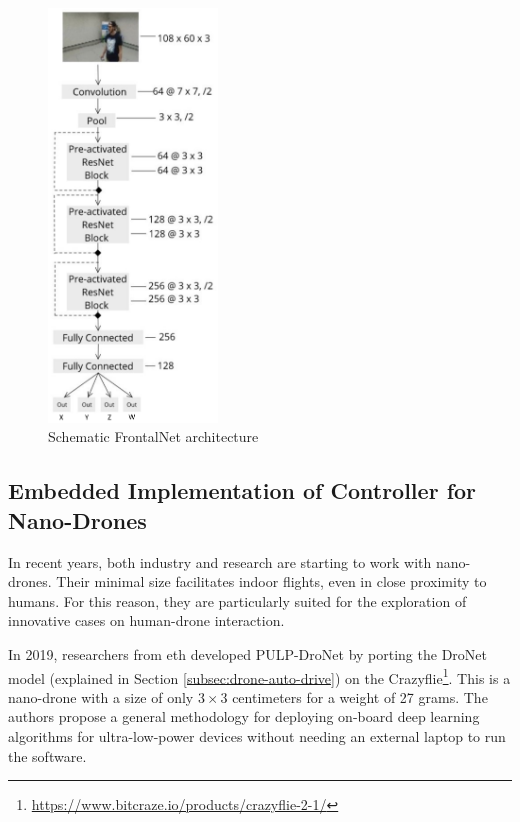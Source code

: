 \begin{figure}[H]
	\centering
	\includegraphics[width=0.4\textwidth]{"contents/images/03-frontalnet-1A"}
	\caption[Schematic FrontalNet architecture]{Schematic FrontalNet architecture \cite{mantegazza2019visionbased}}
	\label{fig:frontalnet-architecture-1}
\end{figure}



\subsection{Embedded Implementation of Controller for Nano-Drones}
\label{subsec:sota-nicky}

In recent years, both industry and research are starting to work with nano-drones. Their minimal size facilitates indoor flights, even in close proximity to humans. For this reason, they are particularly suited for the exploration of innovative cases on human-drone interaction.

\medskip

In 2019, researchers from \gls{eth} developed PULP-DroNet \cite{palossi2019pulpdronetIoTJ} by porting the DroNet \cite{Loquercio_2018} model (explained in Section \ref{subsec:drone-auto-drive}) on the Crazyflie\footnote{\url{https://www.bitcraze.io/products/crazyflie-2-1/}}. This is a nano-drone with a size of only $3 \times 3$ centimeters for a weight of 27 grams. The authors propose a general methodology for deploying on-board deep learning algorithms for ultra-low-power devices without needing an external laptop to run the software.

